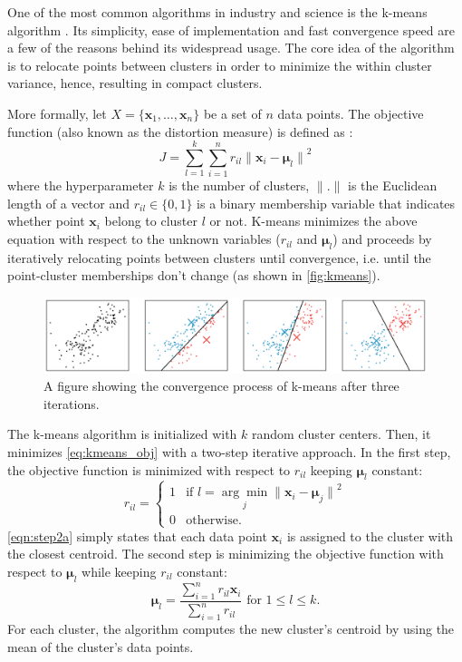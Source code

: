 One of the most common algorithms in industry and science is the k-means algorithm \parencite{macqueen1967some}. Its simplicity, ease of implementation and fast convergence speed are a few of the reasons behind its widespread usage. The core idea of the algorithm is to relocate points between clusters in order to minimize the within cluster variance, hence, resulting in compact clusters.

More formally, let $X = \{\mathbf{x}_1, \ldots, \mathbf{x}_n\}$ be a set of $n$ data points. The objective function (also known as the distortion measure) is defined as \parencite{bishop2006pattern}:
\begin{equation}
    J = \sum^{k}_{l=1}{\sum^{n}_{i=1}{r_{il}{\|\mathbf{x}_i - \boldsymbol{\mu}_l\|}^2}}
    \label{eq:kmeans_obj}
\end{equation}
where the hyperparameter $k$ is the number of clusters, $\|.\|$ is the Euclidean length of a vector and $r_{il} \in \{0,1\}$ is a binary membership variable that indicates whether point $\mathbf{x}_i$ belong to cluster $l$ or not. K-means minimizes the above equation with respect to the unknown variables ($r_{il}$ and $\boldsymbol{\mu}_l$) and proceeds by iteratively relocating points between clusters until convergence, i.e. until the point-cluster memberships don't change (as shown in \autoref{fig:kmeans}).

\begin{figure}
    \centering
    \includegraphics[width=\textwidth]{figures/kmeans.pdf}
    \caption{A figure showing the convergence process of k-means after three iterations.}
    \label{fig:kmeans}
\end{figure}

The k-means algorithm is initialized with $k$ random cluster centers. Then, it minimizes \autoref{eq:kmeans_obj} with a two-step iterative approach. In the first step, the objective function is minimized with respect to $r_{il}$ keeping $\boldsymbol{\mu}_l$ constant:
\begin{equation}
\label{eqn:step2a}
r_{il} = 
    \begin{cases} 
      1 & \text{if } l = \underset{j}{\arg \min}{\|\mathbf{x}_i - \boldsymbol{\mu}_j\|}^2\\
      0 & \text{otherwise}.
   \end{cases}
\end{equation}
\autoref{eqn:step2a} simply states that each data point $\mathbf{x}_i$ is assigned to the cluster with the closest centroid. The second step is minimizing the objective function with respect to $\boldsymbol{\mu}_l$ while keeping $r_{il}$ constant:
\begin{equation}
\label{eqn:step2b}
\boldsymbol{\mu}_l = \frac{\sum_{i=1}^{n}{r_{il} \mathbf{x}_i}}{\sum_{i=1}^{n}{r_{il}}}
        \mbox{ for } 1\leq l \leq k.
\end{equation}
For each cluster, the algorithm computes the new cluster's centroid by using the mean of the cluster's data points. 

